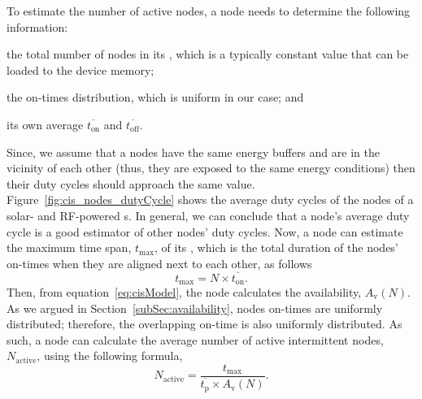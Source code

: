 To estimate the number of active nodes, a \cis node needs to determine the following information:
\begin{enumerate*}[label=(\roman*)]
 \item the total number of nodes in its \cis, which is a typically constant value that can be loaded to the device memory; 
  \item the on-times distribution, which is uniform in our case; and
 \item its own average $\overline{t_\text{on}}$ and $\overline{t_\text{off}}$. 
\end{enumerate*}

Since, we assume that a \cis nodes have the same energy buffers and are in the vicinity of each other (thus, they are exposed to the same energy conditions) then their duty cycles should approach the same value. 
Figure~\ref{fig:cis_nodes_dutyCycle} shows the average duty cycles of the nodes of a solar- and RF-powered \cis{}s. In general, we can conclude that a node's average duty cycle is a good estimator of other \cis nodes' duty cycles.
Now, a node can estimate the maximum time span, $t_\text{max}$, of its \cis, which is the total duration of the nodes' on-times when they are aligned next to each other, as follows
\begin{equation}
t_\text{max} = N\times \overline{t_\text{on}}.
		\label{eq:max_time}
\end{equation}
Then, from equation~\ref{eq:cisModel}, the node calculates the \cis availability, $A_\text{v}(N)$. As we argued in Section~\ref{subSec:availability}, nodes on-times are uniformly distributed; therefore, the overlapping on-time is also uniformly distributed. As such, a node can calculate the average number of active intermittent nodes, $N_\text{active}$, using the following formula,
\begin{equation}
	N_\text{active} = \frac{t_\text{max}}{\overline{t_\text{p}}\times A_\text{v}(N)}.
	\label{eq:active}
\end{equation}

